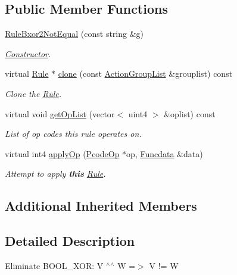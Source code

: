 \subsection*{Public Member Functions}
\begin{DoxyCompactItemize}
\item 
\mbox{\hyperlink{class_rule_bxor2_not_equal_a3a8c26bba2e5ad41d33c4737e8b7089b}{Rule\+Bxor2\+Not\+Equal}} (const string \&g)
\begin{DoxyCompactList}\small\item\em \mbox{\hyperlink{class_constructor}{Constructor}}. \end{DoxyCompactList}\item 
virtual \mbox{\hyperlink{class_rule}{Rule}} $\ast$ \mbox{\hyperlink{class_rule_bxor2_not_equal_a035a4211de0556631e2f3022e56fe24d}{clone}} (const \mbox{\hyperlink{class_action_group_list}{Action\+Group\+List}} \&grouplist) const
\begin{DoxyCompactList}\small\item\em Clone the \mbox{\hyperlink{class_rule}{Rule}}. \end{DoxyCompactList}\item 
virtual void \mbox{\hyperlink{class_rule_bxor2_not_equal_a9bb1bfa0c646bd223ed71f590d803046}{get\+Op\+List}} (vector$<$ uint4 $>$ \&oplist) const
\begin{DoxyCompactList}\small\item\em List of op codes this rule operates on. \end{DoxyCompactList}\item 
virtual int4 \mbox{\hyperlink{class_rule_bxor2_not_equal_a82882cbb68487e82f99e41b6753ca21b}{apply\+Op}} (\mbox{\hyperlink{class_pcode_op}{Pcode\+Op}} $\ast$op, \mbox{\hyperlink{class_funcdata}{Funcdata}} \&data)
\begin{DoxyCompactList}\small\item\em Attempt to apply {\bfseries{this}} \mbox{\hyperlink{class_rule}{Rule}}. \end{DoxyCompactList}\end{DoxyCompactItemize}
\subsection*{Additional Inherited Members}


\subsection{Detailed Description}
Eliminate B\+O\+O\+L\+\_\+\+X\+OR\+: {\ttfamily V $^\wedge$$^\wedge$ W =$>$ V != W} 

